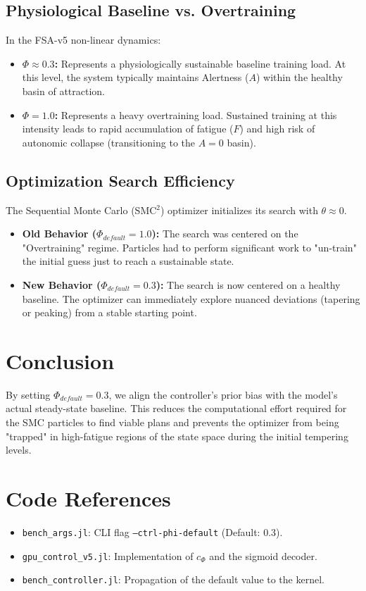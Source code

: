 \documentclass[11pt,a4paper]{article}
\begin{document}
\subsection{Physiological Baseline vs. Overtraining}
In the FSA-v5 non-linear dynamics:
\begin{itemize}
    \item \textbf{$\Phi \approx 0.3$:} Represents a physiologically sustainable baseline training load. At this level, the system typically maintains Alertness ($A$) within the healthy basin of attraction.
    \item \textbf{$\Phi = 1.0$:} Represents a heavy overtraining load. Sustained training at this intensity leads to rapid accumulation of fatigue ($F$) and high risk of autonomic collapse (transitioning to the $A=0$ basin).
\end{itemize}

\subsection{Optimization Search Efficiency}
The Sequential Monte Carlo (SMC$^2$) optimizer initializes its search with $\theta \approx 0$. 
\begin{itemize}
    \item \textbf{Old Behavior ($\Phi_{default} = 1.0$):} The search was centered on the "Overtraining" regime. Particles had to perform significant work to "un-train" the initial guess just to reach a sustainable state.
    \item \textbf{New Behavior ($\Phi_{default} = 0.3$):} The search is now centered on a healthy baseline. The optimizer can immediately explore nuanced deviations (tapering or peaking) from a stable starting point.
\end{itemize}

\section{Conclusion}
By setting $\Phi_{default} = 0.3$, we align the controller's prior bias with the model's actual steady-state baseline. This reduces the computational effort required for the SMC particles to find viable plans and prevents the optimizer from being "trapped" in high-fatigue regions of the state space during the initial tempering levels.

\section*{Code References}
\begin{itemize}
    \item \texttt{bench\_args.jl}: CLI flag \texttt{--ctrl-phi-default} (Default: 0.3).
    \item \texttt{gpu\_control\_v5.jl}: Implementation of $c_\Phi$ and the sigmoid decoder.
    \item \texttt{bench\_controller.jl}: Propagation of the default value to the kernel.
\end{itemize}
\end{document}

